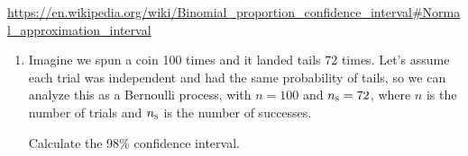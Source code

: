 \documentclass[12pt,letterpaper]{article}
\begin{document}
\url{https://en.wikipedia.org/wiki/Binomial_proportion_confidence_interval#Normal_approximation_interval}


\newpage

\newcommand{\ns}{n_\textsc{s}}
\begin{enumerate}[resume]
\item Imagine we spun a coin 100 times and it landed tails 72 times. Let's assume each trial was independent and had the same probability of tails, so we can analyze this as a Bernoulli process, with $n=100$ and $\ns = 72$, where $n$ is the number of trials and $\ns$ is the number of successes.

Calculate the 98\% confidence interval.
\end{enumerate}


%
\end{document}
